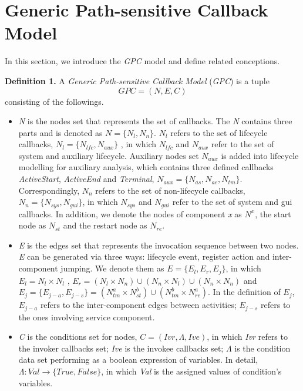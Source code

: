 \section{Generic Path-sensitive Callback Model}\label{transition-model}
In this section, we introduce the \textit{GPC} model and define related conceptions. 

\textbf{Definition 1.} A \textit{Generic Path-sensitive Callback Model} (\textit{GPC}) is a tuple
\begin{equation}
GPC = (N, E, C)
\end{equation}
consisting of the followings.
\begin{itemize}
\item \textit{N} is the nodes set that represents the set of callbacks. The \textit{N} contains three parts and is denoted as $ N = \{N_{l}, N_{n} \} $.  $ N_{l}$ refers to the set of lifecycle callbacks, $N_{l}= \{N_{lfc}, N_{aux}\} $ , in which $N_{lfc}$ and $N_{aux}$ refer to the set of system and auxiliary lifecycle. Auxiliary nodes set $ N_{aux}$ is added into lifecycle modelling for auxiliary analysis, which contains three defined callbacks \textit{ActiveStart}, \textit{ActiveEnd} and \textit{Terminal}, $ N_{aux} = \{N_{as}, N_{ae}, N_{tm} \} $. Correspondingly, $ N_{n}$ refers to the set of non-lifecycle callbacks, $ N_{n} = \{N_{sys}, N_{gui} \} $, in which $N_{sys}$ and $N_{gui}$ refer to the set of system and gui callbacks. In addition, we denote the nodes of component \textit{x} as $N^{x}$, the start node as $ N_{st}$ and the restart node as $ N_{re}$. 
\item \textit{E} is the edges set that represents the invocation sequence between two nodes. \textit{E} can be generated via three ways: lifecycle event, register action and inter-component jumping. We denote them as $ E = \{E_{l}, E_{r}, E_{j} \} $, in which $ E_{l} = N_{l} \times N_{l}$ , $ E_{r}  = (N_{l} \times N_{n}) \cup (N_{n} \times N_{l}) \cup (N_{n} \times N_{n})$ and $ E_{j} = \{E_{j-a}, E_{j-s}\} = (N_{tm}^{a} \times N_{st}^{b}) \cup (N_{tm}^{b}\times N_{re}^{a})$. In the definition of $ E_{j}$, $E_{j-a}$ refers to the inter-component edges between activities; $E_{j-s}$ refers to the ones involving service component.
\item \textit{C} is the conditions set for nodes, $ C = (Ivr, \Lambda, Ive)$, in which \textit{Ivr} refers to the invoker callbacks set; \textit{Ive} is the invokee callbacks set; $\Lambda$ is the condition data set performing as a boolean expression of variables. In detail, $\Lambda : Val \rightarrow \{True, False\}$, in which \textit{Val} is the assigned values of condition's variables.
\end{itemize}

